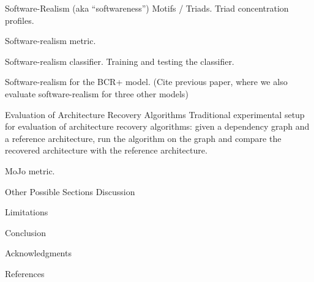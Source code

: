 \documentclass[12pt,a4paper,english]{article}
\begin{document}
\begin{section}{Software-Realism (aka “softwareness”)}
	Motifs / Triads. Triad concentration profiles.

	Software-realism metric.

	Software-realism classifier. Training and testing the classifier.

	Software-realism for the BCR+ model. (Cite previous paper, where we also evaluate software-realism for three other models)
\end{section}

\begin{section}{Evaluation of Architecture Recovery Algorithms}
	Traditional experimental setup for evaluation of architecture recovery algorithms: given a dependency graph and a reference architecture, run the algorithm on the graph and compare the recovered architecture with the reference architecture.
	
	MoJo metric.
	
\end{section}

\begin{section}{Other Possible Sections}
	Discussion
	
	Limitations
	
	Conclusion
	
	Acknowledgments
	
	References	
\end{section}




\end{document}
